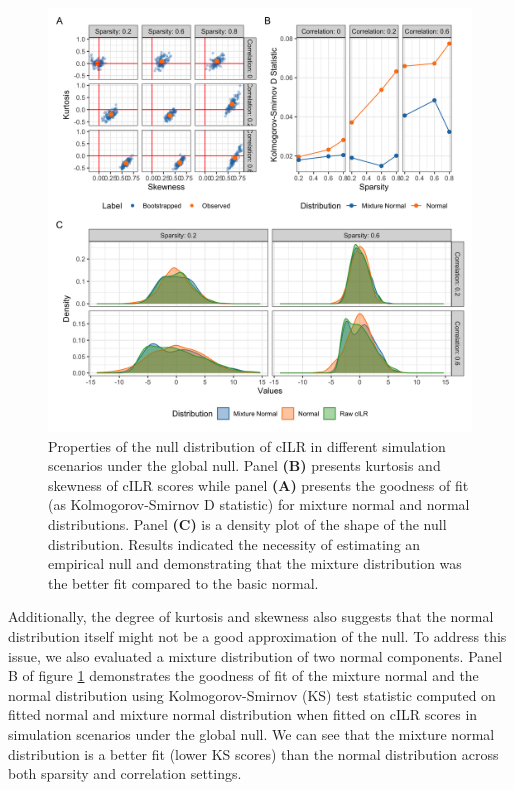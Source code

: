 \documentclass{article}
\begin{document}
\begin{figure} [H]
    \centering
    \includegraphics[width=\linewidth]{figures/kurtosis_skewness_gof.png}
    \caption{Properties of the null distribution of cILR in different simulation scenarios under the global null. Panel \textbf{(B)} presents kurtosis and skewness of cILR scores while panel \textbf{(A)} presents the goodness of fit (as Kolmogorov-Smirnov D statistic) for mixture normal and normal distributions. Panel \textbf{(C)} is a density plot of the shape of the null distribution. Results indicated the necessity of estimating an empirical null and demonstrating that the mixture distribution was the better fit compared to the basic normal.}
    \label{fig:1}
\end{figure}

Additionally, the degree of kurtosis and skewness also suggests that the normal distribution itself might not be a good approximation of the null. To address this issue, we also evaluated a mixture distribution of two normal components. Panel B of figure \ref{fig:1} demonstrates the goodness of fit of the mixture normal and the normal distribution using Kolmogorov-Smirnov (KS) test statistic computed on fitted normal and mixture normal distribution when fitted on cILR scores in simulation scenarios under the global null. We can see that the mixture normal distribution is a better fit (lower KS scores) than the normal distribution across both sparsity and correlation settings. 
\end{document}
